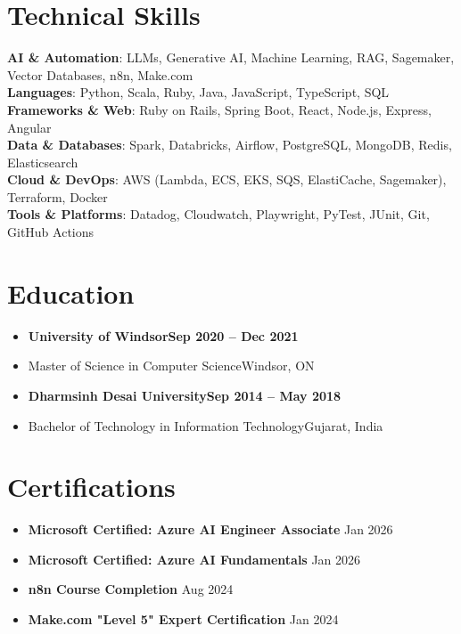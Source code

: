\documentclass[letterpaper,11pt]{article}
\newcommand{\resumeSubHeadingListStart}{\begin{itemize}[leftmargin=0.0in, label={}, itemsep=-3pt]}
\newcommand{\resumeSubHeadingListEnd}{\end{itemize}}
\begin{document}
\section{Technical Skills}
\begin{itemize}[leftmargin=0.0in, label={}]
\small{\item{
\textbf{AI \& Automation}{: LLMs, Generative AI, Machine Learning, RAG, Sagemaker, Vector Databases, n8n, Make.com} \\
\textbf{Languages}{: Python, Scala, Ruby, Java, JavaScript, TypeScript, SQL} \\
\textbf{Frameworks \& Web}{: Ruby on Rails, Spring Boot, React, Node.js, Express, Angular} \\
\textbf{Data \& Databases}{: Spark, Databricks, Airflow, PostgreSQL, MongoDB, Redis, Elasticsearch} \\
\textbf{Cloud \& DevOps}{: AWS (Lambda, ECS, EKS, SQS, ElastiCache, Sagemaker), Terraform, Docker} \\
\textbf{Tools \& Platforms}{: Datadog, Cloudwatch, Playwright, PyTest, JUnit, Git, GitHub Actions} \\
}}
\end{itemize}
\section{Education}
\resumeSubHeadingListStart
\item\small{
\textbf{{University of Windsor}\hfill {Sep 2020 -- Dec 2021}}
}
\item\small{
{Master of Science in Computer Science}\hfill{Windsor, ON}
}
\item\small{
\textbf{{Dharmsinh Desai University}\hfill {Sep 2014 -- May 2018}}
}
\item\small{
{Bachelor of Technology in Information Technology}\hfill{Gujarat, India}
}
\resumeSubHeadingListEnd
\section{Certifications}
\resumeSubHeadingListStart
\item\small{
\textbf{Microsoft Certified: Azure AI Engineer Associate} \hfill Jan 2026
}
\item\small{
\textbf{Microsoft Certified: Azure AI Fundamentals} \hfill Jan 2026
}
\item\small{
\textbf{n8n Course Completion} \hfill Aug 2024
}
\item\small{
\textbf{Make.com "Level 5" Expert Certification} \hfill Jan 2024
}
\resumeSubHeadingListEnd
\end{document}

